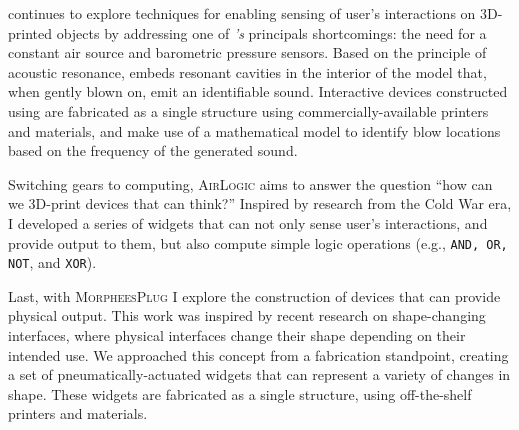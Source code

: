         \textsc{\bh} continues to explore techniques for enabling sensing of
        user's interactions on 3D-printed objects by addressing one of
        \emph{\at's} principals shortcomings: the need for a constant air source
        and barometric pressure sensors. Based on the principle of acoustic
        resonance, \emph{\bh} embeds resonant cavities in the interior of the
        model that, when gently blown on, emit an identifiable sound.
        Interactive devices constructed using \emph{\bh} are fabricated as a
        single structure using commercially-available printers and materials,
        and make use of a mathematical model to identify blow locations based on
        the frequency of the generated sound.

        Switching gears to computing, \textsc{AirLogic} aims to answer the
        question ``how can we 3D-print devices that can think?'' Inspired by
        research from the Cold War era, I developed a series of widgets that can not
        only sense user's interactions, and provide output to them, but also
        compute simple logic operations (e.g., \texttt{AND, OR, NOT}, and
        \texttt{XOR}).

        \newpage
        Last, with \textsc{MorpheesPlug} I explore the construction of devices
        that can provide physical output. This work was inspired by recent
        research on shape-changing interfaces, where physical interfaces change
        their shape depending on their intended use. We approached this concept
        from a fabrication standpoint, creating a set of pneumatically-actuated
        widgets that can represent a variety of changes in shape. These widgets
        are fabricated as a single structure, using off-the-shelf printers and
        materials.